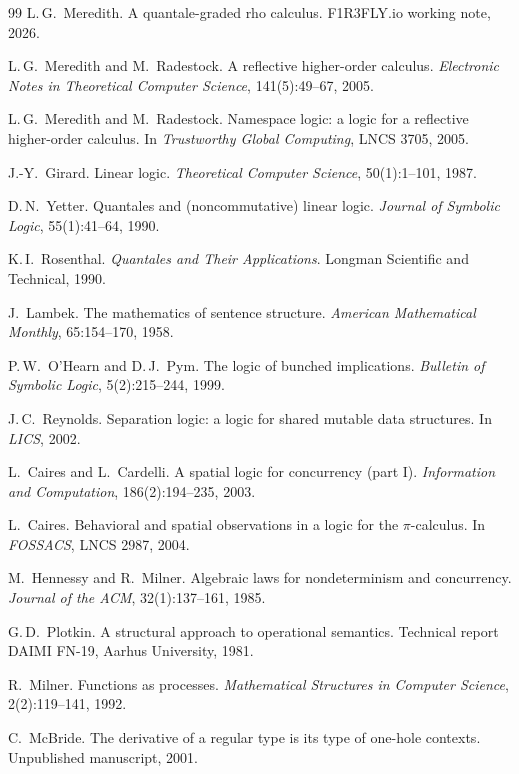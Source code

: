 \documentclass[11pt]{article}
\theoremstyle{definition}
\theoremstyle{plain}
\newcommand{\rhoc}{\textsf{rho}}
\begin{document}
{\begin{thebibliography}{99}
 L.\,G.\ Meredith. A quantale-graded \rhoc{} calculus.
F1R3FLY.io working note, 2026.

 L.\,G.\ Meredith and M.\ Radestock. A reflective
higher-order calculus. \emph{Electronic Notes in Theoretical Computer Science},
141(5):49--67, 2005.

 L.\,G.\ Meredith and M.\ Radestock. Namespace
logic: a logic for a reflective higher-order calculus. In \emph{Trustworthy
Global Computing}, LNCS 3705, 2005.

 J.-Y.\ Girard. Linear logic. \emph{Theoretical Computer
Science}, 50(1):1--101, 1987.

 D.\,N.\ Yetter. Quantales and (noncommutative) linear logic.
\emph{Journal of Symbolic Logic}, 55(1):41--64, 1990.

 K.\,I.\ Rosenthal. \emph{Quantales and Their
Applications}. Longman Scientific and Technical, 1990.

 J.\ Lambek. The mathematics of sentence structure.
\emph{American Mathematical Monthly}, 65:154--170, 1958.

 P.\,W.\ O'Hearn and D.\,J.\ Pym. The logic of bunched
implications. \emph{Bulletin of Symbolic Logic}, 5(2):215--244, 1999.

 J.\,C.\ Reynolds. Separation logic: a logic for shared
mutable data structures. In \emph{LICS}, 2002.

 L.\ Caires and L.\ Cardelli. A spatial logic for
concurrency (part I). \emph{Information and Computation}, 186(2):194--235, 2003.

 L.\ Caires. Behavioral and spatial observations in a logic
for the $\pi$-calculus. In \emph{FOSSACS}, LNCS 2987, 2004.

 M.\ Hennessy and R.\ Milner. Algebraic laws for
nondeterminism and concurrency. \emph{Journal of the ACM}, 32(1):137--161, 1985.

 G.\,D.\ Plotkin. A structural approach to operational
semantics. Technical report DAIMI FN-19, Aarhus University, 1981.

 R.\ Milner. Functions as processes. \emph{Mathematical
Structures in Computer Science}, 2(2):119--141, 1992.

 C.\ McBride. The derivative of a regular type is its type of
one-hole contexts. Unpublished manuscript, 2001.


\end{thebibliography}}
\end{document}
